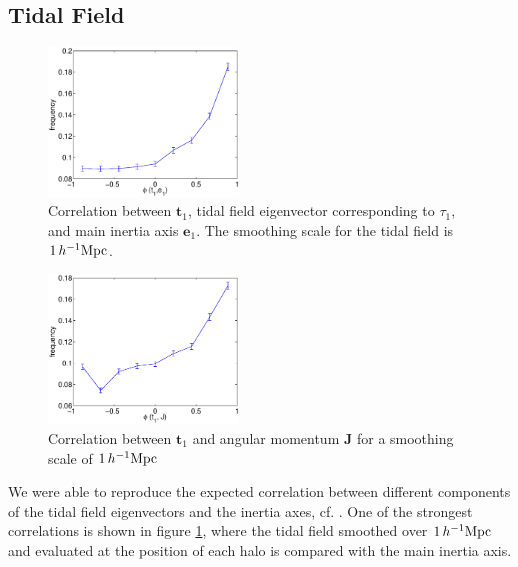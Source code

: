 \documentclass[useAMS,usenatbib]{mn2e}
\begin{document}
\subsection{Tidal Field}
%
%
\begin{figure}
  \begin{center}
    \includegraphics[width=0.45\textwidth]{fig/tea_dgs/out.eps}
  \end{center}

  \caption{ \label{fig:tea_dgs} Correlation between $\mathbf{t}_1$, tidal
    field eigenvector corresponding to $\tau_1$, and main inertia axis
    $\mathbf{e}_1$. The smoothing scale for the tidal field is $1\,h^{-1}{\rm
      Mpc}$.}
\end{figure}
%
%
%
\begin{figure}
  \begin{center}
    \includegraphics[width=0.45\textwidth]{fig/tj_dgs/out.eps}
  \end{center}

  \caption{ \label{fig:tj_dgs} Correlation between $\mathbf{t}_1$ and angular
    momentum $\mathbf{J}$ for a smoothing scale of $1\,h^{-1}{\rm Mpc}$ }
\end{figure}
%
%
We were able to reproduce the expected correlation between different
components of the tidal field eigenvectors and the inertia axes,
cf. \cite{Porciani2002b}. One of the strongest correlations is shown in figure
\ref{fig:tea_dgs}, where the tidal field smoothed over $1\,h^{-1}{\rm Mpc}$
and evaluated at the position of each halo is compared with the main inertia
axis.
\end{document}
